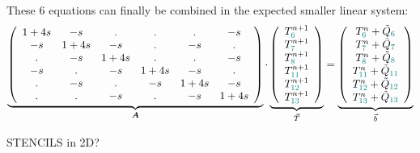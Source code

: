 These 6 equations can finally be combined in the expected smaller linear system:
\[
\underbrace{
\left(
\begin{array}{cccccc}
1+4s & -s & . & . & . & -s \\
-s & 1+4s & -s & . & -s & . \\
. & -s & 1+4s & . & . & -s \\ 
-s & . & -s & 1+4s & -s & . \\
. & -s & . & -s & 1+4s & -s \\
. & . & -s & . & -s & 1+4s 
\end{array}
\right)
}_{\bm A}
\cdot
\underbrace{
\left(
\begin{array}{c}
T_{{\color{teal}6}}^{n+1} \\ 
T_{{\color{teal}7}}^{n+1} \\ 
T_{{\color{teal}8}}^{n+1} \\ 
T_{{\color{teal}11}}^{n+1} \\ 
T_{{\color{teal}12}}^{n+1} \\ 
T_{{\color{teal}13}}^{n+1} 
\end{array}
\right)
}_{\vec T}
=
\underbrace{
\left(
\begin{array}{c}
T_{{\color{teal}6}}^n + \tilde{Q}_{\color{teal}6} \\ 
T_{{\color{teal}7}}^n + \tilde{Q}_{\color{teal}7} \\ 
T_{{\color{teal}8}}^n + \tilde{Q}_{\color{teal}8} \\ 
T_{{\color{teal}11}}^n + \tilde{Q}_{\color{teal}11} \\ 
T_{{\color{teal}12}}^n + \tilde{Q}_{\color{teal}12} \\ 
T_{{\color{teal}13}}^n + \tilde{Q}_{\color{teal}13} 
\end{array}
\right)
}_{\vec b}
\]


STENCILS in 2D? 

